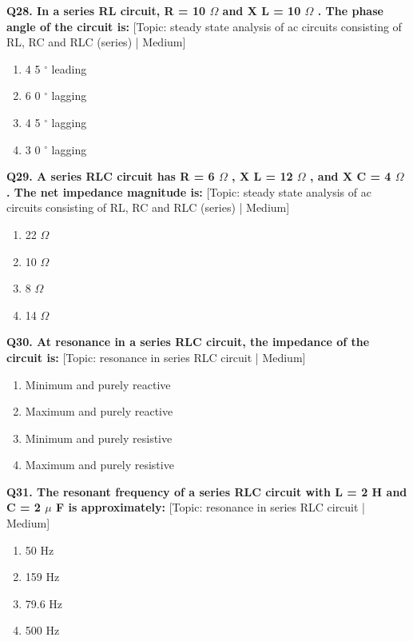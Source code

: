 \noindent\textbf{Q28. In a series RL circuit, R = 10 $\Omega$ and X L = 10 $\Omega$ . The phase angle of the circuit is:} \hfill [Topic: steady state analysis of ac circuits consisting of RL, RC and RLC (series) | Medium]
\begin{enumerate}[label=(\alph*),topsep=2pt,itemsep=1pt,partopsep=0pt,parsep=0pt]
    \item {4 5 $^\circ$ leading}
    \item {6 0 $^\circ$ lagging}
    \item {4 5 $^\circ$ lagging}
    \item {3 0 $^\circ$ lagging}
\end{enumerate}
\vspace{2mm}

\noindent\textbf{Q29. A series RLC circuit has R = 6 $\Omega$ , X L = 12 $\Omega$ , and X C = 4 $\Omega$ . The net impedance magnitude is:} \hfill [Topic: steady state analysis of ac circuits consisting of RL, RC and RLC (series) | Medium]
\begin{enumerate}[label=(\alph*),topsep=2pt,itemsep=1pt,partopsep=0pt,parsep=0pt]
    \item {22 $\Omega$}
    \item {10 $\Omega$}
    \item {8 $\Omega$}
    \item {14 $\Omega$}
\end{enumerate}
\vspace{2mm}

\noindent\textbf{Q30. At resonance in a series RLC circuit, the impedance of the circuit is:} \hfill [Topic: resonance in series RLC circuit | Medium]
\begin{enumerate}[label=(\alph*),topsep=2pt,itemsep=1pt,partopsep=0pt,parsep=0pt]
    \item {Minimum and purely reactive}
    \item {Maximum and purely reactive}
    \item {Minimum and purely resistive}
    \item {Maximum and purely resistive}
\end{enumerate}
\vspace{2mm}

\noindent\textbf{Q31. The resonant frequency of a series RLC circuit with L = 2 H and C = 2 $\mu$ F is approximately:} \hfill [Topic: resonance in series RLC circuit | Medium]
\begin{enumerate}[label=(\alph*),topsep=2pt,itemsep=1pt,partopsep=0pt,parsep=0pt]
    \item {50 Hz}
    \item {159 Hz}
    \item {79.6 Hz}
    \item {500 Hz}
\end{enumerate}
\vspace{2mm}

